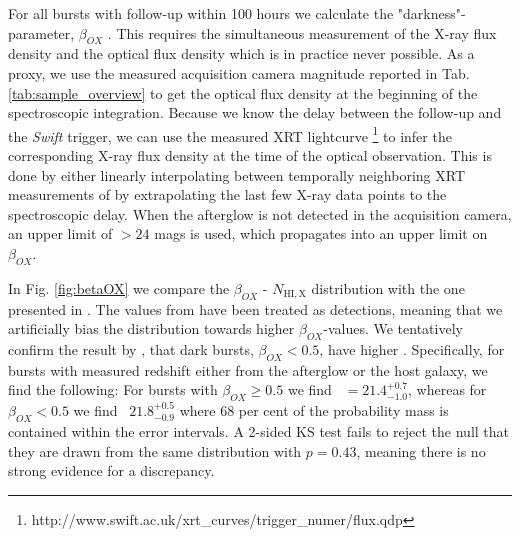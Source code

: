 \documentclass{aa}    %
\begin{document}
For all bursts with follow-up within 100 hours we calculate the
"darkness"-parameter, $\beta_{OX}$ \citep{Jakobsson2004}. This requires the
simultaneous measurement of the X-ray flux density and the optical flux density
which is in practice never possible. As a proxy, we use the measured acquisition
camera magnitude reported in Tab. \ref{tab:sample_overview} to get the optical
flux density at the beginning of the spectroscopic integration. Because we know
the delay between the follow-up and the \textit{Swift} trigger, we can use the
measured XRT lightcurve \citep{Evans2007,
	Evans2009}\footnote{http://www.swift.ac.uk/xrt\_curves/trigger\_numer/flux.qdp}
to infer the corresponding X-ray flux density at the time of the optical
observation. This is done by either linearly interpolating between temporally
neighboring XRT measurements of by extrapolating the last few X-ray data points
to the spectroscopic delay. When the afterglow is not detected in the
acquisition camera, an upper limit of $> 24$ mags is used, which propagates into
an upper limit on $\beta_{OX}$.

In Fig. \ref{fig:betaOX} we compare the $\beta_{OX}$ - $N_{\mathrm{HI, X}}$
distribution with the one presented in \citet{Fynbo2009}. The values from
\citet{Fynbo2009} have been treated as detections, meaning that we artificially
bias the distribution towards higher $\beta_{OX}$-values. We tentatively confirm
the result by \citet{Fynbo2009}, that dark bursts, $\beta_{OX} < 0.5$, have
higher \nhx. Specifically, for bursts with measured redshift either from the
afterglow or the host galaxy, we find the following: For bursts with $\beta_{OX}
\geq 0.5$ we find \nhx~$ = 21.4_{-1.0}^{+0.7}$, whereas for $\beta_{OX} < 0.5$
we find \nhx~$21.8_{-0.9}^{+0.5}$ where 68 per cent of the probability mass is
contained within the error intervals. A 2-sided KS test fails to reject the null
that they are drawn from the same distribution with $p = 0.43$, meaning there is
no strong evidence for a discrepancy.
\end{document}
